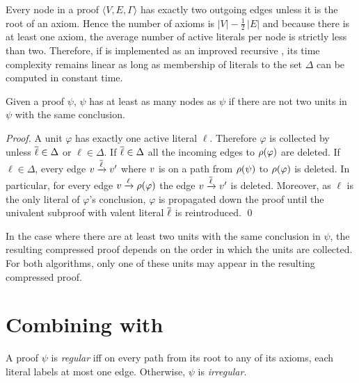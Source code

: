 \documentclass{llncs}
\begin{document}
Every node in a proof $\langle V, E, \Gamma \rangle$ has exactly two outgoing edges unless it is the
root of an axiom. Hence the number of axioms is $|V| - \frac{1}{2}\,|E|$ and because there is at
least one axiom, the average number of active literals per node is strictly less than two.
Therefore, if {\LowerUnivalents} is implemented as an improved recursive , its time
complexity remains linear as long as membership of literals to the set $\Delta$ can be computed in
constant time.

\begin{proposition} \label{prop:compression}
Given a proof $\psi$,
{\LowerUnits\FuncSty{(}$\psi$\FuncSty{)}}
has at least as many nodes as 
{\LowerUnivalents\FuncSty{(}$\psi$\FuncSty{)}}
if there are not two units in $\psi$ with the same conclusion.
\end{proposition}

\begin{proof}
A unit $\varphi$ has exactly one active literal $\ell$. Therefore $\varphi$ is collected by
{\LowerUnivalents} unless $\overline{\ell} \in \Delta$ or $\ell \in \Delta$. If $\overline{\ell} \in \Delta$
all the incoming edges to $\rho(\varphi)$ are deleted. If $\ell \in \Delta$, every edge
$v \xrightarrow{\overline{\ell}} v'$ where $v$ is on a path from $\rho(\psi)$ to $\rho(\varphi)$
is deleted.
In particular, for every edge $v \xrightarrow{\ell} \rho(\varphi)$ the edge $v
\xrightarrow{\overline{\ell}} v'$ is deleted.  Moreover, as $\ell$ is the only literal of $\varphi$'s
conclusion, $\varphi$ is propagated down the proof until the univalent subproof with valent literal
$\overline{\ell}$ is reintroduced. \qed
\end{proof}

In the case where there are at least two units with the same conclusion in $\psi$, the resulting
compressed proof depends on the order in which the units are collected. For both algorithms, only one of these
units may appear in the resulting compressed proof.



\section{Combining {\LowerUnivalents} with {\RPI}} \label{sec:LUnivRPI}

\begin{definition}
A proof $\psi$ is \emph{regular} iff on every path from its root to any of its axioms, each literal
labels at most one edge. Otherwise, $\psi$ is \emph{irregular}.
\end{definition}
\end{document}

